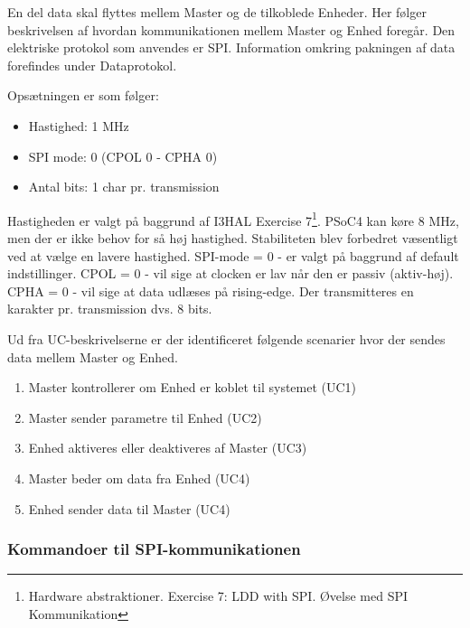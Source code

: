 
En del data skal flyttes mellem Master og de tilkoblede Enheder. Her følger beskrivelsen af hvordan kommunikationen mellem Master og Enhed foregår. Den elektriske protokol som anvendes er SPI.
Information omkring pakningen af data forefindes under Dataprotokol.

Opsætningen er som følger:

\begin{itemize}
  \item Hastighed: 1 MHz
  \item SPI mode: 0 (CPOL 0 - CPHA 0)
  \item Antal bits: 1 char pr. transmission
\end{itemize}

Hastigheden er valgt på baggrund af I3HAL Exercise 7\footnote{Hardware abstraktioner. Exercise 7: LDD with SPI. Øvelse med SPI Kommunikation}. PSoC4 kan køre 8 MHz, men der er ikke behov for så høj hastighed. Stabiliteten blev forbedret væsentligt ved at vælge en lavere hastighed. 
\newline SPI-mode = 0 - er valgt på baggrund af default indstillinger. 
\newline CPOL = 0 - vil sige at clocken er lav når den er passiv (aktiv-høj). 
\newline CPHA = 0 - vil sige at data udlæses på rising-edge. 
\newline Der transmitteres en karakter pr. transmission dvs. 8 bits.

Ud fra UC-beskrivelserne er der identificeret følgende scenarier hvor der sendes data mellem Master og Enhed.

\begin{enumerate}
	\item Master kontrollerer om Enhed er koblet til systemet (UC1)
	\item Master sender parametre til Enhed (UC2)
	\item Enhed aktiveres eller deaktiveres af Master (UC3)
	\item Master beder om data fra Enhed (UC4)
	\item Enhed sender data til Master (UC4)
\end{enumerate}


\subsubsection*{Kommandoer til SPI-kommunikationen}

